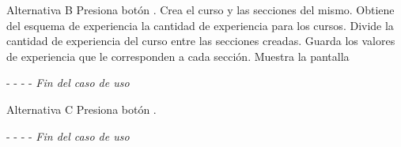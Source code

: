 \begin{UCtrayectoria}{Alternativa B}
    \actor Presiona botón .
    \sistema Crea el curso y las secciones del mismo.
    \sistema Obtiene del esquema de experiencia la cantidad de experiencia para los cursos.
    \sistema Divide la cantidad de experiencia del curso entre las secciones creadas.
    \sistema Guarda los valores de experiencia que le corresponden a cada sección.
    \sistema Muestra la pantalla 
    \item[- -] - - {\em Fin del caso de uso}
\end{UCtrayectoria}

\begin{UCtrayectoria}[Cancelar]{Alternativa C}
    \actor Presiona botón .
    \item[- -] - - {\em Fin del caso de uso}
\end{UCtrayectoria}


\clearpage